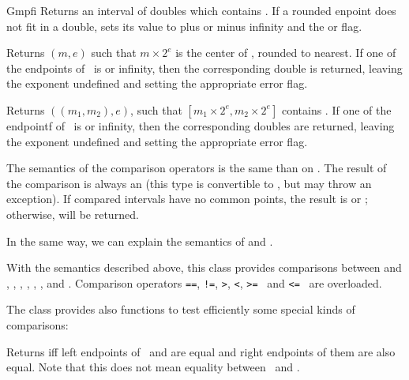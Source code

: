 \begin{ccRefClass} {Gmpfi}
        {Returns an interval of doubles which contains \ccVar. If a
        rounded enpoint does not fit in a double, sets its value to plus
        or minus infinity and the  or  flag.}

        {Returns \((m,e)\) such that \(m \times 2^e\) is the center of
        \ccVar, rounded to nearest. If one of the endpoints of \ccVar~is
         or infinity, then the corresponding double is returned,
        leaving the exponent undefined and setting the appropriate
        error flag.}

        {Returns \(((m_1,m_2),e)\), such that \([m_1 \times 2^e,m_2
        \times 2^e]\) contains \ccVar . If one of the endpointf of
        \ccVar~is  or infinity, then the corresponding doubles
        are returned, leaving the exponent undefined and setting the
        appropriate error flag.}



The semantics of the comparison operators is the same than
on .  The result of the comparison
is always an  (this type is convertible to
, but may throw an exception).  If compared intervals have
no common points, the result is  or ; otherwise,
 will be returned.

In the same way, we can explain the semantics of
 and .

With the semantics described above, this class provides comparisons between
 and , , ,
, , , 
and . Comparison operators \verb-==-, \verb-!=-, \verb->-,
\verb-<-, \verb->=- \ and \verb-<=- \ are overloaded.

The class provides also functions to test efficiently some special kinds
of comparisons:

        {Returns  iff left endpoints of \ccVar~and
         are equal and right endpoints of them are also equal. Note
        that this does not mean equality between \ccVar~and .}


\end{ccRefClass}
